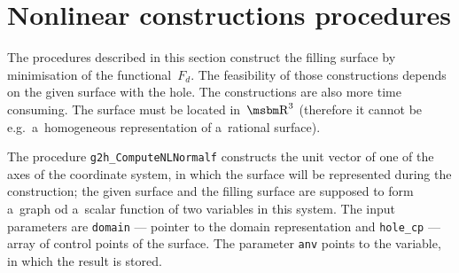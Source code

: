 
\vspace{\bigskipamount}

\vspace{\bigskipamount}

\vspace{\bigskipamount}

\vspace{\bigskipamount}


\section{Nonlinear constructions procedures}

The procedures described in this section construct the filling surface
by minimisation of the functional~$F_d$. The feasibility of those constructions
depends on the given surface with the hole. The constructions are
also more time consuming. The surface must be located in~$\R^3$ (therefore
it cannot be e.g.\ a~homogeneous representation of a~rational surface).

\vspace{\bigskipamount}
The procedure \texttt{g2h\_ComputeNLNormalf} constructs the unit vector
of one of the axes of the coordinate system, in which the surface
will be represented during the construction; the given surface and the
filling surface are supposed to form a~graph od a~scalar function
of two variables in this system. The input parameters are \texttt{domain} ---
pointer to the domain representation and \texttt{hole\_cp} --- array
of control points of the surface.
The parameter \texttt{anv} points to the variable, in which the result is
stored.


